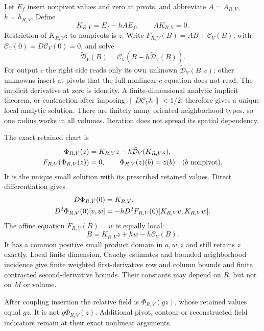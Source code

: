 \documentclass[11pt]{article}
\theoremstyle{remark}
\begin{document}
Let $E_f$ insert nonpivot values and zero at pivots, and abbreviate
$A=A_{R,V}$, $h=h_{R,V}$. Define
\begin{equation}
 K_{R,V}=E_f-hAE_f,\qquad AK_{R,V}=0.
 \label{cmg-insertion}
\end{equation}
Restriction of $K_{R,V}z$ to nonpivots is $z$. Write
$F_{R,V}(B)=AB+\mathcal C_V(B)$, with
$\mathcal C_V(0)=D\mathcal C_V(0)=0$, and solve
\begin{equation}
 \widetilde{\mathcal D}_V(B)
       =\mathcal C_V(B-h\widetilde{\mathcal D}_V(B)).
 \label{cmg-implicit-correction}
\end{equation}
For output $c$ the right side reads only its own unknown
$\widetilde{\mathcal D}_V(B;c)$: other unknowns insert at pivots that
the full nonlinear $c$ equation does not read. The implicit derivative
at zero is identity. A finite-dimensional analytic implicit theorem,
or contraction after imposing $\lVert D\mathcal C_V h\rVert<1/2$,
therefore gives a unique local analytic solution. There are finitely
many oriented neighborhood types, so one radius works in all volumes.
Iteration does not spread its spatial dependency.

The exact retained chart is
\begin{align}
 \Phi_{R,V}(z)
   &=K_{R,V}z-h\widetilde{\mathcal D}_V(K_{R,V}z),\notag\\
 F_{R,V}(\Phi_{R,V}(z))&=0,\qquad
 \Phi_{R,V}(z)(b)=z(b)\quad(b\text{ nonpivot}).
 \label{cmg-retained-chart}
\end{align}
It is the unique small solution with its prescribed retained values.
Direct differentiation gives
\begin{align}
 D\Phi_{R,V}(0)&=K_{R,V},\notag\\
 D^2\Phi_{R,V}(0)[v,w]
   &=-hD^2F_{R,V}(0)[K_{R,V}v,K_{R,V}w].
 \label{cmg-chart-derivatives}
\end{align}
The affine equation $F_{R,V}(B)=w$ is equally local:
\begin{equation}
 B=K_{R,V}z+hw-h\mathcal C_V(B).
 \label{cmg-affine-chart}
\end{equation}
It has a common positive small product domain in $a,w,z$ and still
retains $z$ exactly. Local finite dimension, Cauchy estimates and
bounded neighborhood incidence give finite weighted first-derivative
row and column bounds and finite contracted second-derivative bounds.
Their constants may depend on $R$, but not on $M$ or volume.

After coupling insertion the relative field is
$\Phi_{R,V}(gz)$, whose retained values equal $gz$.
It is not $g\Phi_{R,V}(z)$. Additional pivot, contour or reconstructed
field indicators remain at their exact nonlinear arguments.
\end{document}
